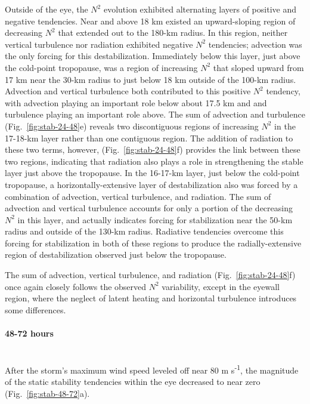 \documentclass{ametsoc}
\begin{document}
Outside of the eye, the $N^2$ evolution exhibited alternating layers of positive and negative tendencies.
Near and above 18 km existed an upward-sloping region of decreasing $N^2$ that extended out to the 180-km radius.
In this region, neither vertical turbulence nor radiation exhibited negative $N^2$ tendencies; advection was the only forcing for this destabilization.
Immediately below this layer, just above the cold-point tropopause, was a region of increasing $N^2$ that sloped upward from 17 km near the 30-km radius to just below 18 km outside of the 100-km radius.
Advection and vertical turbulence both contributed to this positive $N^2$ tendency, with advection playing an important role below about 17.5 km and and turbulence playing an important role above.
The sum of advection and turbulence (Fig.~\ref{fig:stab-24-48}e) reveals two discontiguous regions of increasing $N^2$ in the 17-18-km layer rather than one contiguous region.
The addition of radiation to these two terms, however, (Fig.~\ref{fig:stab-24-48}f) provides the link between these two regions, indicating that radiation also plays a role in strengthening the stable layer just above the tropopause.
In the 16-17-km layer, just below the cold-point tropopause, a horizontally-extensive layer of destabilization also was forced by a combination of advection, vertical turbulence, and radiation.
The sum of advection and vertical turbulence accounts for only a portion of the decreasing $N^2$ in this layer, and actually indicates forcing for stabilization near the 50-km radius and outside of the 130-km radius.
Radiative tendencies overcome this forcing for stabilization in both of these regions to produce the radially-extensive region of destabilization observed just below the tropopause.

The sum of advection, vertical turbulence, and radiation (Fig.~\ref{fig:stab-24-48}f) once again closely follows the observed $N^2$ variability, except in the eyewall region, where the neglect of latent heating and horizontal turbulence introduces some differences.

\paragraph{48-72 hours}\mbox{}\\
\indent After the storm's maximum wind speed leveled off near 80 m s\textsuperscript{-1}, the magnitude of the static stability tendencies within the eye decreased to near zero (Fig.~\ref{fig:stab-48-72}a).
\end{document}
